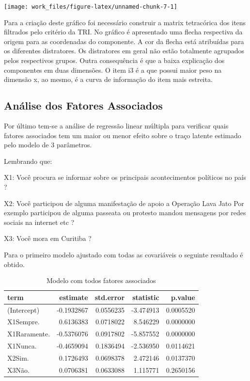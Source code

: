 \documentclass[]{article}
\begin{document}
\begin{center}\texttt{[image: work\_files/figure-latex/unnamed-chunk-7-1]} \end{center}

Para a criação deste gráfico foi necessário construir a matrix
tetracórica dos itens filtrados pelo critério da TRI. No gráfico é
apresentado uma flecha respectiva da origem para as coordenadas do
componente. A cor da flecha está atribuídas para os diferentes
distratores. Os distratores em geral não estão totalmente agrupados
pelos respectivos grupos. Outra consequência é que a baixa explicação
dos componentes em duas dimensões. O item i3 é a que possui maior peso
na dimensão x, ao mesmo, é a curva de informação do item mais estreita.

\subsection{Análise dos Fatores
Associados}\label{analise-dos-fatores-associados}

Por último tem-se a análise de regressão linear múltipla para verificar
quais fatores associados tem um maior ou menor efeito sobre o traço
latente estimado pelo modelo de 3 parâmetros.

Lembrando que:

X1: Você procura se informar sobre os principais acontecimentos
políticos no país ?

X2: Você participou de alguma manifestação de apoio a Operação Lava Jato
Por exemplo participou de alguma passeata ou protesto mandou mensagens
por redes sociais na internet etc ?

X3: Você mora em Curitiba ?

Para o primeiro modelo ajustado com todas as covariáveis o seguinte
resultado é obtido.

\begin{table}[!h]

\caption{\label{tab:first-model}Modelo com todos fatores associados}
\centering
\begin{tabular}[t]{lrrrr}
\toprule
term & estimate & std.error & statistic & p.value\\
\midrule
(Intercept) & -0.1932867 & 0.0556235 & -3.474913 & 0.0005520\\
X1Sempre. & 0.6136383 & 0.0718022 & 8.546229 & 0.0000000\\
X1Raramente. & -0.5376076 & 0.0917802 & -5.857552 & 0.0000000\\
X1Nunca. & -0.4659094 & 0.1836494 & -2.536950 & 0.0114621\\
X2Sim. & 0.1726493 & 0.0698378 & 2.472146 & 0.0137370\\
X3Não. & 0.0706381 & 0.0633088 & 1.115771 & 0.2650156\\
\bottomrule
\end{tabular}
\end{table}
\end{document}
